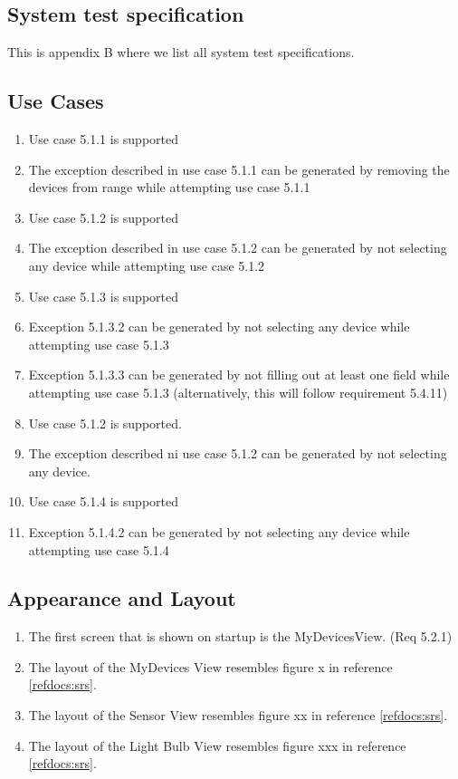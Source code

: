 \documentclass[a4paper]{article}
\newlength{\testlabellength}
\newenvironment{testlist}{\begin{enumerate}[label=\bfseries Test \thesubsection.\arabic* , labelindent=0pt, labelwidth=\testlabellength , leftmargin=2cm]}{\end{enumerate}}
\begin{document}
\begin{appendices}
\newpage

\section{System test specification} \label{appendix:section:systemtest}
This is appendix B where we list all system test specifications.

\subsection{Use Cases}
\begin{testlist}
	\item Use case 5.1.1 is supported
	\item The exception described in use case 5.1.1 can be generated by removing the devices from range while attempting use case 5.1.1
	
	\item Use case 5.1.2 is supported
	\item The exception described in use case 5.1.2 can be generated by not selecting any device while attempting use case 5.1.2
	
	\item Use case 5.1.3 is supported
	\item Exception 5.1.3.2 can be generated by not selecting any device while attempting use case 5.1.3
	\item Exception 5.1.3.3 can be generated by not filling out at least one field while attempting use case	5.1.3 (alternatively, this will follow requirement 5.4.11)
	
	\item Use case 5.1.2 is supported.
	\item The exception described ni use case 5.1.2 can be generated by not selecting any device.
	
	\item Use case 5.1.4 is supported
	\item Exception 5.1.4.2 can be generated by not selecting any device while attempting use case 5.1.4
	
\end{testlist}

\subsection{Appearance and Layout}

\begin{testlist}
	\item The first screen that is shown on startup is the MyDevicesView. (Req 5.2.1)
	\item The layout of the MyDevices View resembles figure x in reference \ref{refdocs:srs}.
	\item The layout of the Sensor View resembles figure xx in reference \ref{refdocs:srs}.
	\item The layout of the Light Bulb View resembles figure xxx in reference \ref{refdocs:srs}.
\end{testlist}


\end{appendices}
\end{document}
